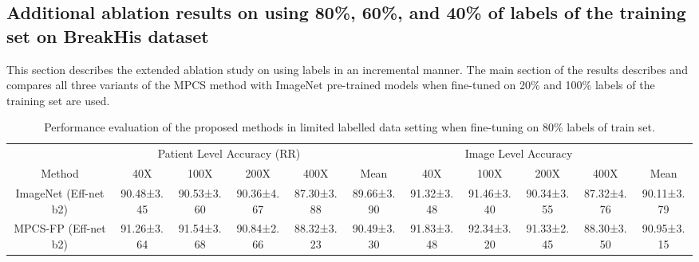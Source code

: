\documentclass[conference]{IEEEtran}
\begin{document}
\subsection{Additional ablation results on using 80\%, 60\%, and 40\% of labels of the training set on BreakHis dataset}
This section describes the extended ablation study on using labels in an incremental manner. The main section of the results describes and compares all three variants of the MPCS method with ImageNet pre-trained models when fine-tuned on 20\% and 100\% labels of the training set are used.
\begin{table*}[h]
\centering
\caption{Performance evaluation of the proposed methods in limited labelled data setting when fine-tuning on 80\% labels of train set.}
\label{tab:breakhis_80_label_mpcs}
\begin{adjustbox}{max width=\textwidth}
\begin{tabular}{c|cccc|c|cccc|c}
\hline
                         & \multicolumn{4}{c|}{Patient Level Accuracy (RR)}                                                                                                                                       &                        & \multicolumn{4}{c|}{Image Level Accuracy}                                                                        &                        \\ \cline{2-5} \cline{7-10}
\multirow{-2}{*}{Method} & \multicolumn{1}{c|}{40X}        & \multicolumn{1}{c|}{100X}                               & \multicolumn{1}{c|}{200X}                              & 400X                              & \multirow{-2}{*}{Mean} & \multicolumn{1}{c|}{40X}        & \multicolumn{1}{c|}{100X}       & \multicolumn{1}{c|}{200X}       & 400X       & \multirow{-2}{*}{Mean} \\ \hline
ImageNet (Eff-net b2)    & \multicolumn{1}{c|}{90.48±3.45} & \multicolumn{1}{c|}{90.53±3.60}                         & \multicolumn{1}{c|}{90.36±4.67}                        & 87.30±3.88                        & 89.66±3.90             & \multicolumn{1}{c|}{91.32±3.48} & \multicolumn{1}{c|}{91.46±3.40} & \multicolumn{1}{c|}{90.34±3.55} & 87.32±4.76 & 90.11±3.79             \\
MPCS-FP (Eff-net b2)     & \multicolumn{1}{c|}{91.26±3.64} & \multicolumn{1}{c|}{91.54±3.68}                         & \multicolumn{1}{c|}{90.84±2.66}                        & 88.32±3.23                        & 90.49±3.30             & \multicolumn{1}{c|}{91.83±3.48} & \multicolumn{1}{c|}{92.34±3.20} & \multicolumn{1}{c|}{91.33±2.45} & 88.30±3.50 & 90.95±3.15             \\

\end{tabular}
\end{adjustbox}
\end{table*}
\end{document}
